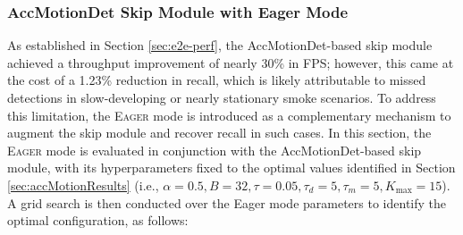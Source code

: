 \documentclass[
  10pt,
]{article}
\begin{document}
\subsubsection{AccMotionDet Skip Module with Eager
Mode}\label{accmotiondet-skip-module-with-eager-mode}



As established in Section \ref{sec:e2e-perf}, the AccMotionDet-based
skip module achieved a throughput improvement of nearly 30\% in FPS;
however, this came at the cost of a 1.23\% reduction in recall, which is
likely attributable to missed detections in slow-developing or nearly
stationary smoke scenarios. To address this limitation, the
\textsc{Eager} mode is introduced as a complementary mechanism to
augment the skip module and recover recall in such cases. In this
section, the \textsc{Eager} mode is evaluated in conjunction with the
AccMotionDet-based skip module, with its hyperparameters fixed to the
optimal values identified in Section \ref{sec:accMotionResults} (i.e.,
\(\alpha{=}0.5,B{=}32,\tau{=}0.05,\tau_d{=}5,\tau_m{=}5,K_{\max}{=}15\)).
A grid search is then conducted over the Eager mode parameters to
identify the optimal configuration, as follows:
\end{document}
